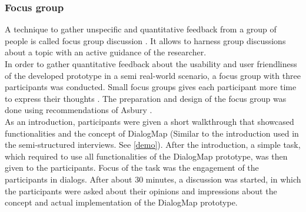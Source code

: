 \subsubsection{Focus group}

A technique to gather unspecific and quantitative feedback from a group of people is called focus group discussion \cite{morgan1996_focus_groups}. It allows to harness group discussions about a topic with an active guidance of the researcher.\\
In order to gather quantitative feedback about the usability and user friendliness of the developed prototype in a semi real-world scenario, a focus group with three participants was conducted. Small focus groups gives each participant more time to express their thoughts \cite{morgan1996_focus_groups}. The preparation and design of the focus group was done using recommendations of Asbury \cite{asbury1995overview}.\\
As an introduction, participants were given a short walkthrough that showcased functionalities and the concept of DialogMap (Similar to the introduction used in the semi-structured interviews. See \ref{demo}). After the introduction, a simple task, which required to use all functionalities of the DialogMap prototype, was then given to the participants. Focus of the task was the engagement of the participants in dialogs. After about 30 minutes, a discussion was started, in which the participants were asked about their opinions and impressions about the concept and actual implementation of the DialogMap prototype.

